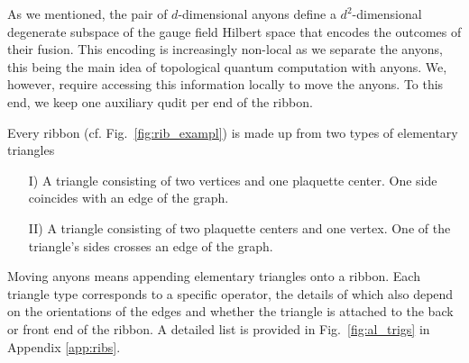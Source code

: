 \documentclass[two column]{article}
\begin{document}
As we mentioned, the pair of $d$-dimensional anyons define a $d^2$-dimensional degenerate subspace of the gauge field Hilbert space that encodes the outcomes of their fusion. This encoding is increasingly non-local as we separate the anyons, this being the main idea of topological quantum computation with anyons. We, however, require accessing this information locally to move the anyons. To this end, we keep one auxiliary qudit per end of the ribbon.

Every ribbon (cf. Fig.~\ref{fig:rib_exampl}) is made up from two types of elementary triangles
\begin{itemize}
    \item[I)] A triangle consisting of two vertices and one plaquette center. One side coincides with an edge of the graph.
        \item[II)] A triangle consisting of two plaquette centers and one vertex. One of the triangle's sides crosses an edge of the graph.
\end{itemize}
Moving anyons means appending elementary triangles onto a ribbon. Each triangle type corresponds to a specific operator, the details of which also depend on the orientations of the edges and whether the triangle is attached to the back or front end of the ribbon. A detailed list is provided in Fig.~\ref{fig:al_trigs} in Appendix \ref{app:ribs}.
\end{document}
